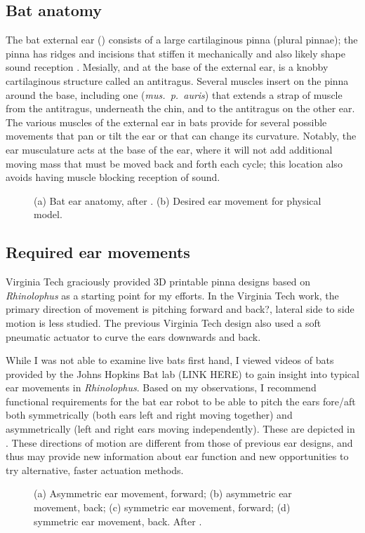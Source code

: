 \documentclass{article}
\begin{document}
\subsection{Bat anatomy}
The bat external ear () consists of a large cartilaginous pinna (plural pinnae); the pinna has ridges and incisions that stiffen it mechanically and also likely shape sound reception \citep{heine2004anatomy, pannala2013investigation, pannala2013interplay, schouten2019principles}. Mesially, and at the base of the external ear, is a knobby cartilaginous structure called an antitragus. Several muscles insert on the pinna around the base, including one (\emph{mus.~p.~auris}) that extends a strap of muscle from the antitragus, underneath the chin, and to the antitragus on the other ear. The various muscles of the external ear in bats provide for several possible movements that pan or tilt the ear or that can change its curvature. Notably, the ear musculature acts at the base of the ear, where it will not add additional moving mass that must be moved back and forth each cycle; this location also avoids having muscle blocking reception of sound. 
\begin{figure}[h]
\caption{(a) Bat ear anatomy, after \citep{pannala2013investigation}. (b) Desired ear movement for physical model.}
\label{fig:1}
\end{figure}

\subsection{Required ear movements}
Virginia Tech graciously provided 3D printable pinna designs based on \emph{Rhinolophus} as a starting point for my efforts. In the Virginia Tech work, the primary direction of movement is pitching forward and back?, lateral side to side motion is less studied. The previous Virginia Tech design also used a soft pneumatic actuator to curve the ears downwards and back.%

While I was not able to examine live bats first hand, I viewed videos of bats provided by the Johns Hopkins Bat lab (LINK HERE) to gain insight into typical ear movements in \emph{Rhinolophus}. Based on my observations, I recommend functional requirements for the bat ear robot to be able to pitch the ears fore/aft both symmetrically (both ears left and right moving together) and asymmetrically (left and right ears moving independently). These are depicted in . These directions of motion are different from those of previous ear designs, and thus may provide new information about ear function and new opportunities to try alternative, faster actuation methods. 
\begin{figure}[h]
\caption{(a) Asymmetric ear movement, forward; (b) asymmetric ear movement, back; (c) symmetric ear movement, forward; (d) symmetric ear movement, back. After \citep{pannala2013investigation}.}
\label{fig:2}
\end{figure}
\end{document}
